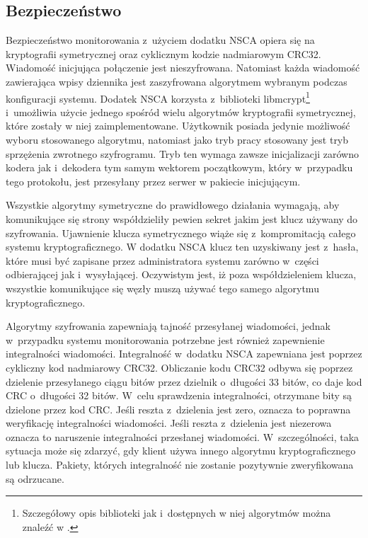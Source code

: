 \subsection[Bezpieczeństwo][Bezpieczeństwo]{Bezpieczeństwo}

Bezpieczeństwo monitorowania z~użyciem dodatku NSCA opiera się na
kryptografii symetrycznej oraz cyklicznym kodzie nadmiarowym
CRC32. Wiadomość inicjująca połączenie jest nieszyfrowana. Natomiast
każda wiadomość zawierająca wpisy dziennika jest zaszyfrowana
algorytmem wybranym podczas konfiguracji systemu. Dodatek NSCA
korzysta z~biblioteki libmcrypt\footnote{Szczegółowy opis biblioteki
  jak i~dostępnych w niej algorytmów można znaleźć w
  \cite{www:libmcrypt}.} i~umożliwia użycie jednego spośród wielu
algorytmów kryptografii symetrycznej, które zostały w niej
zaimplementowane. Użytkownik posiada jedynie możliwość wyboru
stosowanego algorytmu, natomiast jako tryb pracy stosowany jest tryb
sprzężenia zwrotnego szyfrogramu. Tryb ten wymaga zawsze inicjalizacji
zarówno kodera jak i~dekodera tym samym wektorem początkowym, który
w~przypadku tego protokołu, jest przesyłany przez serwer w pakiecie
inicjującym.

Wszystkie algorytmy symetryczne do prawidłowego działania wymagają,
aby komunikujące się strony współdzieliły pewien sekret jakim jest
klucz używany do szyfrowania. Ujawnienie klucza symetrycznego wiąże
się z~kompromitacją całego systemu kryptograficznego. W dodatku NSCA
klucz ten uzyskiwany jest z~hasła, które musi być zapisane przez
administratora systemu zarówno w~części odbierającej jak
i~wysyłającej. Oczywistym jest, iż poza współdzieleniem klucza,
wszystkie komunikujące się węzły muszą używać tego samego algorytmu
kryptograficznego.

Algorytmy szyfrowania zapewniają tajność przesyłanej wiadomości,
jednak w~przypadku systemu monitorowania potrzebne jest również
zapewnienie integralności wiadomości. Integralność w~dodatku NSCA
zapewniana jest poprzez cykliczny kod nadmiarowy CRC32. Obliczanie
kodu CRC32 odbywa się poprzez dzielenie przesyłanego ciągu bitów przez
dzielnik o~długości 33 bitów, co daje kod CRC o~długości 32
bitów. W~celu sprawdzenia integralności, otrzymane bity są dzielone
przez kod CRC. Jeśli reszta z~dzielenia jest zero, oznacza to poprawna
weryfikację integralności wiadomości. Jeśli reszta z~dzielenia jest
niezerowa oznacza to naruszenie integralności przesłanej
wiadomości. W~szczególności, taka sytuacja może się zdarzyć, gdy
klient używa innego algorytmu kryptograficznego lub klucza. Pakiety,
których integralność nie zostanie pozytywnie zweryfikowana są
odrzucane.

